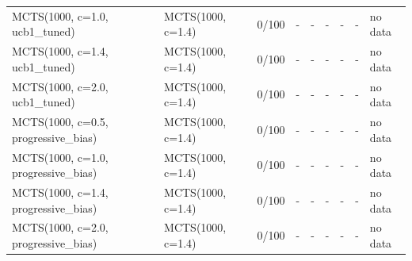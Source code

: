 \begin{table}[!t]
\begin{tabular}{lllllllll}
MCTS(1000, c=1.0, ucb1\_tuned) & MCTS(1000, c=1.4) & 0/100 & - & - & - & - & - & no data \\
MCTS(1000, c=1.4, ucb1\_tuned) & MCTS(1000, c=1.4) & 0/100 & - & - & - & - & - & no data \\
MCTS(1000, c=2.0, ucb1\_tuned) & MCTS(1000, c=1.4) & 0/100 & - & - & - & - & - & no data \\
MCTS(1000, c=0.5, progressive\_bias) & MCTS(1000, c=1.4) & 0/100 & - & - & - & - & - & no data \\
MCTS(1000, c=1.0, progressive\_bias) & MCTS(1000, c=1.4) & 0/100 & - & - & - & - & - & no data \\
MCTS(1000, c=1.4, progressive\_bias) & MCTS(1000, c=1.4) & 0/100 & - & - & - & - & - & no data \\
MCTS(1000, c=2.0, progressive\_bias) & MCTS(1000, c=1.4) & 0/100 & - & - & - & - & - & no data \\
\bottomrule
\end{tabular}
\end{table}
